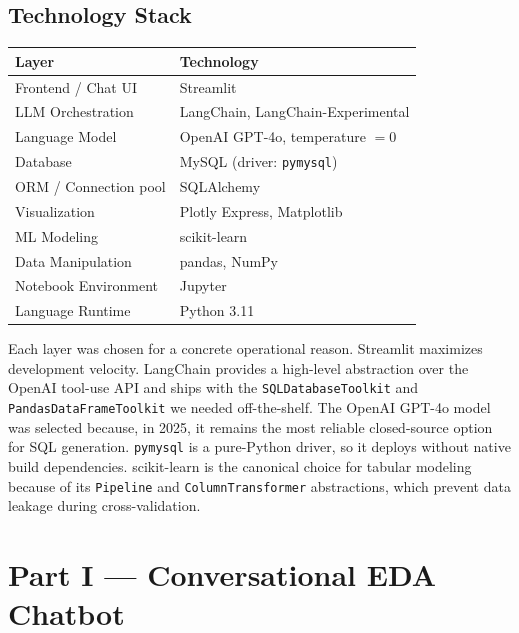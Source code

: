 \documentclass[11pt,a4paper]{article}
\begin{document}
\subsection{Technology Stack}

\begin{center}
\begin{tabular}{@{}ll@{}}
\toprule
\textbf{Layer} & \textbf{Technology} \\
\midrule
Frontend / Chat UI       & Streamlit \\
LLM Orchestration        & LangChain, LangChain-Experimental \\
Language Model           & OpenAI GPT-4o, temperature $= 0$ \\
Database                 & MySQL (driver: \texttt{pymysql}) \\
ORM / Connection pool    & SQLAlchemy \\
Visualization            & Plotly Express, Matplotlib \\
ML Modeling              & scikit-learn \\
Data Manipulation        & pandas, NumPy \\
Notebook Environment     & Jupyter \\
Language Runtime         & Python 3.11 \\
\bottomrule
\end{tabular}
\end{center}

Each layer was chosen for a concrete operational reason. Streamlit
maximizes development velocity. LangChain provides a high-level
abstraction over the OpenAI tool-use API and ships with the
\texttt{SQLDatabaseToolkit} and \texttt{PandasDataFrameToolkit} we
needed off-the-shelf. The OpenAI GPT-4o model was selected because, in
2025, it remains the most reliable closed-source option for SQL
generation. \texttt{pymysql} is a pure-Python driver, so it deploys
without native build dependencies. scikit-learn is the canonical choice
for tabular modeling because of its \texttt{Pipeline} and
\texttt{ColumnTransformer} abstractions, which prevent data leakage
during cross-validation.

\section{Part I --- Conversational EDA Chatbot}
\end{document}
